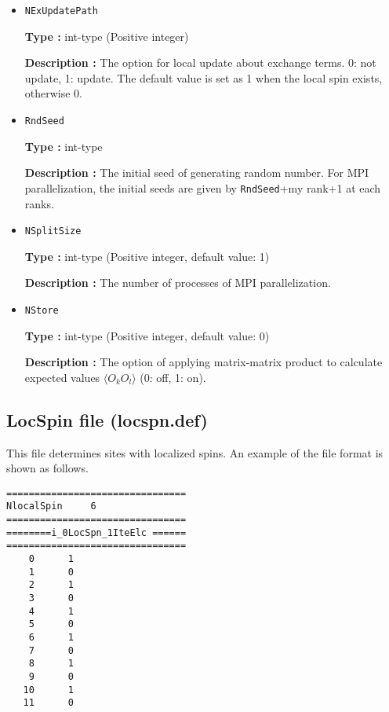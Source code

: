 \begin{itemize}
\item \verb|NExUpdatePath|

{\bf Type :} int-type (Positive integer)

{\bf Description :}  The option for local update about exchange terms. 0: not update, 1: update. The default value is set as 1 when the local spin exists, otherwise 0.

\item \verb|RndSeed|

{\bf Type :} int-type 

{\bf Description :} The initial seed of generating random number. For MPI parallelization, the initial seeds are given by \verb|RndSeed|+my rank+1 at each ranks. 

 \item \verb|NSplitSize|

{\bf Type :} int-type (Positive integer, default value: 1)

{\bf Description :} The number of processes of MPI parallelization.

\item \verb|NStore|

{\bf Type :} int-type (Positive integer, default value: 0)

{\bf Description :} The option of applying matrix-matrix product to calculate expected values $\langle O_k O_l \rangle$ (0: off, 1: on).  
 
 \end{itemize}


\newpage
\subsection{LocSpin file (locspn.def)}
\label{Subsec:locspn}
This file determines sites with localized spins. An example of the file format is shown as follows.\\
\begin{minipage}{10cm}
\begin{screen}
\begin{verbatim}
================================ 
NlocalSpin     6  
================================ 
========i_0LocSpn_1IteElc ====== 
================================ 
    0      1
    1      0
    2      1
    3      0
    4      1
    5      0
    6      1
    7      0
    8      1
    9      0
   10      1
   11      0
\end{verbatim}
\end{screen}
\end{minipage}


